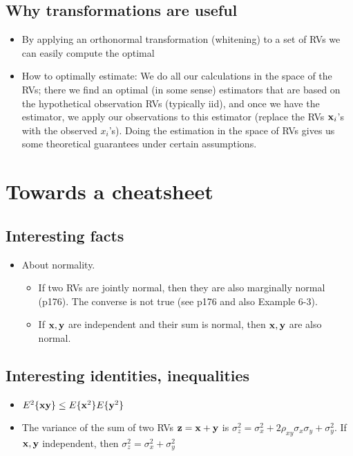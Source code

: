 \documentclass[a4paper, oneside]{book}
\begin{document}
\section{Why transformations are useful}
\begin{itemize}
\item By applying an orthonormal transformation (\aka whitening) to a set of RVs we can easily compute the optimal 
\item How to optimally estimate: We do all our calculations in the space of the RVs; there we find an optimal (in some sense) estimators that are based on the hypothetical observation RVs (typically iid), and once we have the estimator, we apply our observations to this estimator (\ie replace the RVs $\mathbf{x}_i$'s with the observed $x_i$'s). Doing the estimation in the space of RVs gives us some theoretical guarantees under certain assumptions.
\end{itemize}

\chapter*{Towards a cheatsheet}

\section{Interesting facts}

\begin{itemize}
\item About normality.
	\begin{itemize}
	\item If two RVs are jointly normal, then they are also marginally normal (p176). The converse is not true (see p176 and also Example 6-3).
	\item If $\mathbf{x,y}$ are independent and their sum is normal, then $\mathbf{x,y}$ are also normal.
	
	\end{itemize}
\end{itemize}

\section{Interesting identities, inequalities}
\begin{itemize}
\item $E^2\{\mathbf{xy}\} \le E\{\mathbf x^2\} E\{\mathbf y^2\}$
\item The variance of the sum of two RVs $\mathbf{z = x+y }$ is $\sigma_z^2 = \sigma_x^2 + 2\rho_{xy} \sigma_x\sigma_y+ \sigma_y^2$. If $\mathbf{x,y}$ independent, then $\sigma_z^2 = \sigma_x^2 + \sigma_y^2$
\end{itemize}
\end{document}
